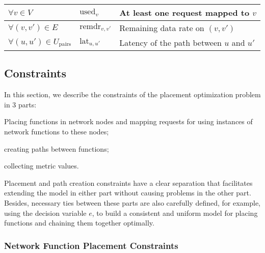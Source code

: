 \documentclass[10pt,a4paper,conference]{IEEEtran}
\begin{document}
\begin{table}[!t]
\begin{tabular}{lll}
$ \forall v {\in} V $                                                                                                        & $ \text{used}_{v} $     	& At least one request mapped to $ v $                                                                                         \\ \hline
$ \forall (v,v') {\in} E $                                                                                                   & $ \text{remdr}_{v,v'} $ 	& Remaining data rate on $ (v,v') $                                                                                                                    \\ \hline
$ \forall (u,u') {\in} U_\text{pairs} $                                                                                      & $ \text{lat}_{u,u'} $   	& Latency of the path between $ u $ and $ u' $                                                                                          \\ \hline
\end{tabular}
\end{table}

\subsection{Constraints}
\label{subsec:constraints}

In this section, we describe the constraints of the placement optimization problem 
in 3 parts:
\begin{inparaenum}
 \item Placing functions in network nodes and mapping requests for using instances
 of network functions to these nodes;
 \item creating paths between functions;
 \item collecting metric values.
\end{inparaenum}
Placement and path creation constraints have a clear separation that facilitates 
extending the model in either part without causing problems in the other part.
Besides, necessary ties between these parts are also carefully defined, for example, using
the decision variable $ e $, to build a
consistent and uniform model for placing functions and chaining them together optimally.

\subsubsection{Network Function Placement Constraints}
\end{document}
